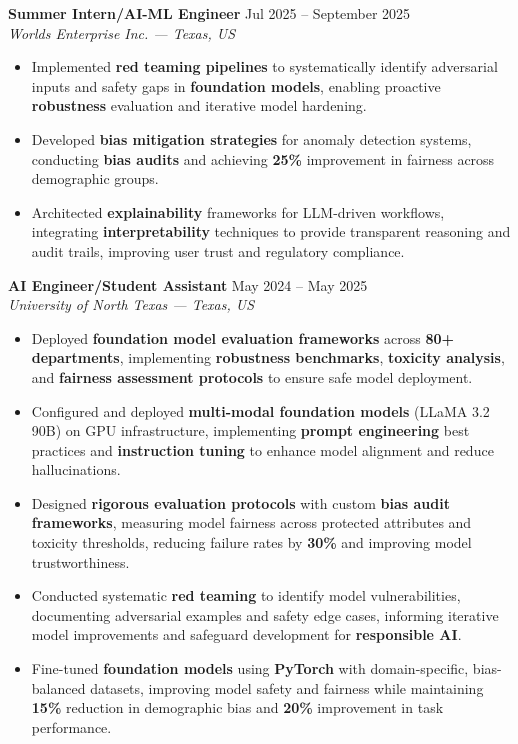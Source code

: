 \documentclass[11pt,a4paper]{article}
\newcommand{\jobentry}[3]{%
  \vspace{5pt}%
  \noindent\textbf{#1} \hfill #3\\%
  \textit{#2}%
}
\begin{document}
\jobentry{Summer Intern/AI-ML Engineer}{Worlds Enterprise Inc. — Texas, US}{Jul 2025 -- September 2025}
\begin{itemize}
\item Implemented \textbf{red teaming pipelines} to systematically identify adversarial inputs and safety gaps in \textbf{foundation models}, enabling proactive \textbf{robustness} evaluation and iterative model hardening.
\item Developed \textbf{bias mitigation strategies} for anomaly detection systems, conducting \textbf{bias audits} and achieving \textbf{25\%} improvement in fairness across demographic groups.
\item Architected \textbf{explainability} frameworks for LLM-driven workflows, integrating \textbf{interpretability} techniques to provide transparent reasoning and audit trails, improving user trust and regulatory compliance.
\end{itemize}

\jobentry{AI Engineer/Student Assistant}{University of North Texas — Texas, US}{May 2024 -- May 2025}
\begin{itemize}
\item Deployed \textbf{foundation model evaluation frameworks} across \textbf{80+ departments}, implementing \textbf{robustness benchmarks}, \textbf{toxicity analysis}, and \textbf{fairness assessment protocols} to ensure safe model deployment.
\item Configured and deployed \textbf{multi-modal foundation models} (LLaMA 3.2 90B) on GPU infrastructure, implementing \textbf{prompt engineering} best practices and \textbf{instruction tuning} to enhance model alignment and reduce hallucinations.
\item Designed \textbf{rigorous evaluation protocols} with custom \textbf{bias audit frameworks}, measuring model fairness across protected attributes and toxicity thresholds, reducing failure rates by \textbf{30\%} and improving model trustworthiness.
\item Conducted systematic \textbf{red teaming} to identify model vulnerabilities, documenting adversarial examples and safety edge cases, informing iterative model improvements and safeguard development for \textbf{responsible AI}.
\item Fine-tuned \textbf{foundation models} using \textbf{PyTorch} with domain-specific, bias-balanced datasets, improving model safety and fairness while maintaining \textbf{15\%} reduction in demographic bias and \textbf{20\%} improvement in task performance.
\end{itemize}
\end{document}

